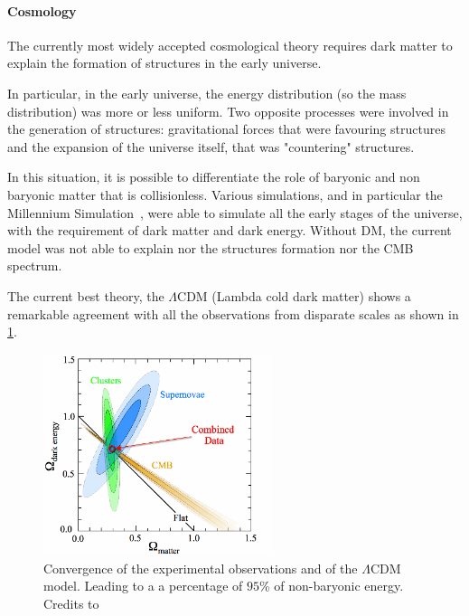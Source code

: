 \paragraph{Cosmology}

The currently most widely accepted cosmological theory requires dark matter to explain the formation of structures in the early universe.

In particular, in the early universe, the energy distribution (so the mass distribution) was more or less uniform.
Two opposite processes were involved in the generation of structures: gravitational forces that were favouring structures and the expansion of the universe itself, that was "countering" structures.

In this situation, it is possible to differentiate the role of baryonic and non baryonic matter that is collisionless.
Various simulations, and in particular the Millennium Simulation~\cite{Springel2005}, were able to simulate all the early stages of the universe, with the requirement of dark matter and dark energy. 
Without DM, the current model was not able to explain nor the structures formation nor the CMB spectrum.

The current best theory, the $\Lambda$CDM (Lambda cold dark matter) shows a remarkable agreement with all the observations from disparate scales as shown in \cref{fig:convergence_dm}.

\begin{figure}
    \centering
    \includegraphics[width=0.6\textwidth]{Theory/figures/dark_energy_concordance.png}
    \caption[Dark Matter quantity expected from observations and theory]{Convergence of the experimental observations and of the $\Lambda$CDM model. Leading to a a percentage of $95$\% of non-baryonic energy. Credits to \cite{Einasto2009}}
    \label{fig:convergence_dm}
\end{figure}

